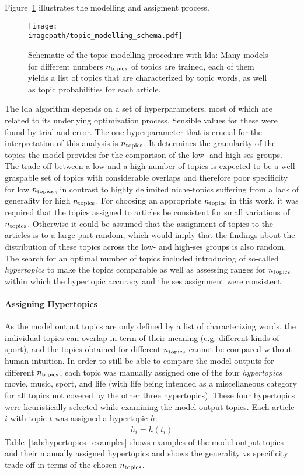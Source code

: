 Figure~\ref{fig:topic_modelling_schema} illustrates the modelling and assigment process.
\begin{figure}
    \centering
    \texttt{[image: \\imagepath/topic\_modelling\_schema.pdf]}
    \caption{Schematic of the topic modelling procedure with \gls{lda}: Many models for different numbers $n_\text{topics}$ of topics are trained, each of them yields a list of topics that are characterized by topic words, as well as topic probabilities for each article.}\label{fig:topic_modelling_schema}
\end{figure}

The \gls{lda} algorithm depends on a set of hyperparameters, most of which are related to its underlying optimization process.  Sensible values for these were found by trial and error. The one hyperparameter that is crucial for the interpretation of this analysis is $n_\text{topics}$. It determines the granularity of the topics the model provides for the comparison of the low- and high-\gls{ses} groups. The trade-off between a low and a high number of topics is expected to be a well-graspable set of topics with considerable overlaps and therefore poor specificity for low $n_\text{topics}$, in contrast to highly delimited niche-topics suffering from a lack of generality for high $n_\text{topics}$. For choosing an appropriate $n_\text{topics}$ in this work, it was required that the topics assigned to articles be consistent for small variations of $n_\text{topics}$. Otherwise it could be assumed that the assignment of topics to the articles is to a large part random, which would imply that the findings about the distribution of these topics across the low- and high-\gls{ses} groups is also random. The search for an optimal number of topics included introducing of so-called \textit{hypertopics} to make the topics comparable as well as assessing ranges for $n_\text{topics}$ within which the hypertopic accuracy and the \gls{ses} assignment were consistent:

\paragraph{Assigning Hypertopics}
As the model output topics are only defined by a list of characterizing words, the individual topics can overlap in term of their meaning (e.g. different kinds of sport), and the topics obtained for different $n_\text{topics}$ cannot be compared without human intuition. In order to still be able to compare the model outputs for different $n_\text{topics}$, each topic was manually assigned one of the four \textit{hypertopics} movie, music, sport, and life (with life being intended as a miscellaneous category for all topics not covered by the other three hypertopics). These four hypertopics were heuristically selected while examining the model output topics. Each article $i$ with topic $t$ was assigned a hypertopic $h$:
\begin{align}
    h_i = h(t_i)
\end{align}
Table~\ref{tab:hypertopics_examples} shows examples of the model output topics and their manually assigned hypertopics and shows the generality vs specificity trade-off in terms of the chosen $n_\text{topics}$.

